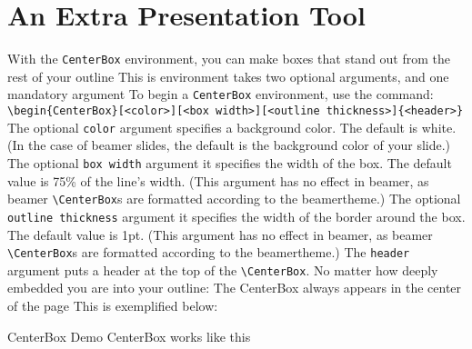 \documentclass[11pt]{article}
\begin{document}
			
\section{An Extra Presentation Tool}\label{sec: centerbox}
\1 With the \verb+CenterBox+ environment, you can make boxes that stand out from the rest of your outline
	\2 This is environment takes two optional arguments, and one mandatory argument
\1 To begin a \verb+CenterBox+ environment, use the command:\\\verb+\begin{CenterBox}[<color>][<box width>][<outline thickness>]{<header>}+
	\2 The optional \texttt{color} argument specifies a background color. The default is white.
		\3 (In the case of beamer slides, the default is the background color of your slide.)
	\2 The optional \texttt{box width} argument it specifies the width of the box. The default value is 75\% of the line's width.
		\3 (This argument has no effect in beamer, as beamer \verb+\CenterBox+s are formatted according to the beamertheme.)
	\2 The optional \texttt{outline thickness} argument it specifies the width of the border around the box. The default value is 1pt.
		\3 (This argument has no effect in beamer, as beamer \verb+\CenterBox+s are formatted according to the beamertheme.)
	\2 The \texttt{header} argument puts a header at the top of the \verb+\CenterBox+.
\1 No matter how deeply embedded you are into your outline:
	\2 The CenterBox always appears in the center of the page
		\3 This is exemplified below:
		\begin{CenterBox}{CenterBox Demo}
			CenterBox works like this			
		\end{CenterBox}
		
\end{document}

